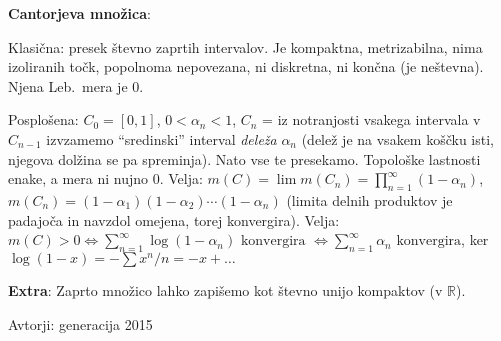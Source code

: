 \documentclass[a4paper,oneside,10pt]{article}
\theoremstyle{definition}
\newcommand{\R}{\ensuremath{\mathbb{R}}}
\newenvironment{itemize*}{\vspace{-10pt}\begin{itemize}\setlength{\itemsep}{0pt}\setlength{\parskip}{2pt}}{\end{itemize}}
\begin{document}
\textbf{Cantorjeva množica}:
\begin{itemize*}
  \item Klasična: presek števno zaprtih intervalov.  Je kompaktna, metrizabilna,
    nima izoliranih točk, popolnoma nepovezana, ni diskretna, ni končna (je
    neštevna). Njena Leb.\ mera je 0.
  \item Posplošena: $C_0 = [0,1]$, $0<\alpha_n < 1$, $C_n$ = iz notranjosti
    vsakega intervala v $C_{n-1}$ izvzamemo ``sredinski'' interval \emph{deleža}
    $\alpha_n$ (delež je na vsakem koščku isti, njegova dolžina se pa spreminja).
    Nato vse te presekamo.  Topološke lastnosti enake, a mera ni nujno 0. Velja:
    $m(C) = \lim m(C_n) = \prod_{n = 1}^\infty (1 - \alpha_n)$, $m(C_n) = (1 -
    \alpha_1) (1 - \alpha_2) \cdots (1 - \alpha_n)$ (limita delnih produktov je
    padajoča in navzdol omejena, torej konvergira).  Velja: $m(C) > 0 \iff
    \sum_{n = 1}^\infty \log(1 - \alpha_n) \text{ konvergira } \iff \sum_{n =
    1}^\infty \alpha_n \text{ konvergira}$, ker $\log(1 - x) = - \sum x^n/n = -x
    + \ldots$
\end{itemize*}

\textbf{Extra}: Zaprto množico lahko zapišemo kot števno unijo kompaktov (v $\R$).

\hspace*{\fill} Avtorji: generacija 2015
\end{document}
